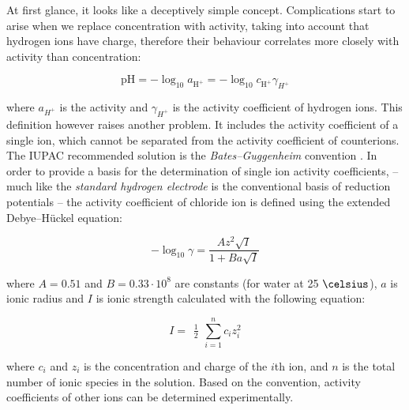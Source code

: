 \documentclass[manuscript=article, journal=jceda8]{achemso}
\begin{document}
At first glance, it looks like a deceptively simple concept. Complications start to arise when we replace concentration with activity, taking into account that hydrogen ions have charge, therefore their behaviour correlates more closely with activity than concentration:

\begin{equation}
\textrm{pH} = -\log_{10} a_{\textrm{H}^+} = -\log_{10} c_{\textrm{H}^+} \gamma_{H^+}
\end{equation}

where $a_{H^+}$ is the activity and $\gamma_{H^+}$ is the activity coefficient of hydrogen ions. This definition however raises another problem. It includes the activity coefficient of a single ion, which cannot be separated from the activity coefficient of counterions. The IUPAC recommended solution \cite{buck2002measurement} is the \emph{Bates--Guggenheim} convention  \cite{bates1960report}. In order to provide a basis for the determination of single ion activity coefficients, -- much like the \emph{standard hydrogen electrode} is the conventional basis of reduction potentials -- the activity coefficient of chloride ion is defined using the extended Debye--Hückel equation:

\begin{equation}
-\log_{10} \gamma = \frac{A z^2 \sqrt{I}} {1 + Ba\sqrt{I} }
\label{EDH}
\end{equation}

where $A = 0.51$ and $B = 0.33 \cdot 10^8 $ are constants (for water at 25 $\celsius$), $a$ is ionic radius and $I$ is ionic strength calculated with the following equation:

\begin{equation}
I = \begin{matrix}\frac{1}{2}\end{matrix}\sum_{i=1}^{n} c_i z_i^{2}
\label{ionic_strength}
\end{equation}

where $c_i$ and $z_i$ is the concentration and charge of the $i$th ion, and $n$ is the total number of ionic species in the solution. Based on the convention, activity coefficients of other ions can be determined experimentally.
\end{document}
